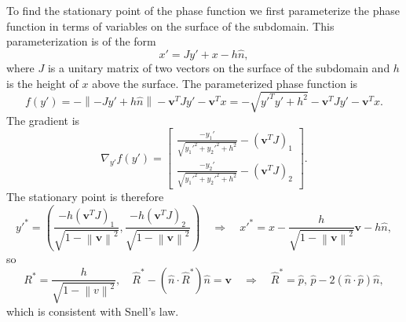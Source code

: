 \documentclass{article}
\newcommand{\norm}[1]{\left\lVert #1 \right\rVert}
\theoremstyle{plain}
\begin{document}
To find the stationary point of the phase function we first parameterize the phase function
in terms of variables on the surface of the subdomain. This parameterization is of the form
\begin{equation}
	x' = Jy' + x - h\hat{n},
\end{equation}
where $J$ is a unitary matrix of two vectors on the surface of the subdomain
and $h$ is the height of $x$ above the surface.
The parameterized phase function is
\begin{equation}
	f(y') = -\norm{-Jy' + h\hat{n}} - \mathbf{v}^T Jy' - \mathbf{v}^T x
	= - \sqrt{ y'^Ty' + h^2 } - \mathbf{v}^T Jy' - \mathbf{v}^T x.
\end{equation}
The gradient is
\begin{equation}
	\nabla_{y'} f(y') = 
	\begin{bmatrix}
		\frac{-y_1'}{\sqrt{y_1'^{2} + y_2'^{2} + h^2}} - (\mathbf{v}^TJ)_1 \\
		\frac{-y_2'}{\sqrt{y_1'^{2} + y_2'^{2} + h^2}} - (\mathbf{v}^TJ)_2
	\end{bmatrix}.
\end{equation} %
The stationary point is therefore
\begin{equation}
	y'^{*} = \left( \frac{-h(\mathbf{v}^TJ)_1}{\sqrt{ 1 - \norm{\mathbf{v}}^2 }}, \frac{-h(\mathbf{v}^TJ)_2}{\sqrt{ 1 - \norm{\mathbf{v}}^2 }} \right)
	\quad\Rightarrow\quad x'^{*} = x - \frac{h}{\sqrt{ 1 - \norm{\mathbf{v}}^2 }}\mathbf{v} - h\hat{n},
\end{equation}
so
\begin{equation}
	R^* = \frac{h}{\sqrt{1-\norm{v}^2}},
	\quad \hat{R}^* - \left( \hat{n}\cdot\hat{R}^* \right)\hat{n} = \mathbf{v}
	\quad\Rightarrow\quad \hat{R}^* =  \hat{p}\text{, } \hat{p} - 2\left( \hat{n}\cdot\hat{p} \right)\hat{n},
\end{equation}
which is consistent with Snell's law.
\end{document}
